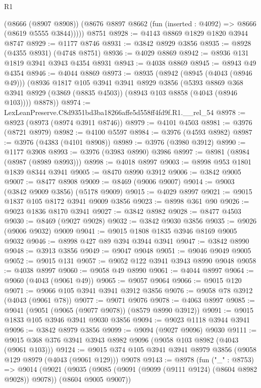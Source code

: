 \begin{lexlean}{R1}
\begin{coremodule}
        (@8666 (@8907 @8908))
        (@8676 @8897 @8662 (fun (inserted : @4092) => @8666 (@8619 @5555 @3844)))))
    @8751
@8928 := @4143 @8869 @1829 @1820 @3944 @8747
@8929 := @1177 @8746
@8931 := @3842 @8929 @3856
@8935 := @8928 (@4355 @8931) (@4748 @8751)
@8936 := @4029 @8869
@8942 := @8936 @131 @1819 @3941 @3943 @4354 @8931
@8943 := @4038 @8869
@8945 := @8943 @49 @4354
@8946 := @4044 @8869
@8973 := @8935
    (@8942
      (@8945 (@4043 (@8946 @49)))
      (@8936
        @1817
        @105
        @3941
        @3941
        @8929
        @3856
        (@5393 @8869 @368 @3941 @8929 (@3869 (@8835 @4503)) (@8943 @103 @8858 (@4043 (@8946 @103))))
        @8878))
@8974 := LexLeanPreserve.C8d9351bd3ba18266affe5d558ff4fd9f.R1.__rel_54
@8978 := @8923 (@8973 (@8974 @3911 @8746))
@8979 := @4101 @4503
@8981 := @3976 (@8721 @8979)
@8982 := @4100 @5597
@8984 := @3976 (@4593 @8982)
@8987 := @3976 (@4383 (@4101 @8908))
@8989 := @3976 (@3980 @3912)
@8990 := @1177 @3908
@8993 := @3976 (@3983 @8990) @3986
@8997 := @8981 (@8984 (@8987 (@8989 @8993)))
@8998 := @4018 @8997
@9003 := @8998 @953 @1801 @1839 @8344 @3941
@9005 := @8470 @8990 @3912
@9006 := @3842 @9005
@9007 := @8477 @8908
@9009 := @8469 (@9006 @9007)
@9014 := @9003 (@3842 @9009 @3856) (@5178 @9009)
@9015 := @4029 @8997
@9021 := @9015 @1837 @105 @8172 @3941 @9009 @3856
@9023 := @8998 @361 @90
@9026 := @9023 @1836 @8170 @3941
@9027 := @3842 @8982
@9028 := @8477 @4503
@9030 := @8469 (@9027 @9028)
@9032 := @3842 @9030 @3856
@9035 := @9026 (@9006 @9032) @9009
@9041 := @9015 @1808 @1835 @3946 @8169 @9005 @9032
@9046 := @8998 @427 @89 @394 @3944 @3941
@9047 := @3842 @8990
@9048 := @3913 @3856
@9049 := @9047 @9048
@9051 := @9046 @9049 @9005
@9052 := @9015 @131
@9057 := @9052 @122 @3941 @3943 @8990 @9048
@9058 := @4038 @8997
@9060 := @9058 @49 @8990
@9061 := @4044 @8997
@9064 := @9060 (@4043 (@9061 @49))
@9065 := @9057 @9064
@9066 := @9015 @120
@9071 := @9066 @105 @3941 @3941 @3912 @3856
@9076 := @9058 @78 @3912 (@4043 (@9061 @78))
@9077 := @9071 @9076
@9078 := @4063 @8997
@9085 := @9041 (@9051 (@9065 (@9077 @9078)) (@8579 @8990 @3912))
@9091 := @9015 @1833 @105 @3946 @3941 @9030 @3856
@9094 := @9023 @1118 @3944 @3941
@9096 := @3842 @8979 @3856
@9099 := @9094 (@9027 @9096) @9030
@9111 := @9015 @368 @376 @3941 @3943 @8982 @9096 (@9058 @103 @8982 (@4043 (@9061 @103)))
@9124 := @9015 @374 @105 @3941 @3941 @8979 @3856 (@9058 @129 @8979 (@4043 (@9061 @129))) @9078
@9143 := @8978
    (fun ("_" : @8753) =>
    @9014
      (@9021
        (@9035 (@9085 (@9091 (@9099 (@9111 @9124) (@8604 @8982 @9028)) @9078)) (@8604 @9005 @9007))

\end{coremodule}
\end{lexlean}
